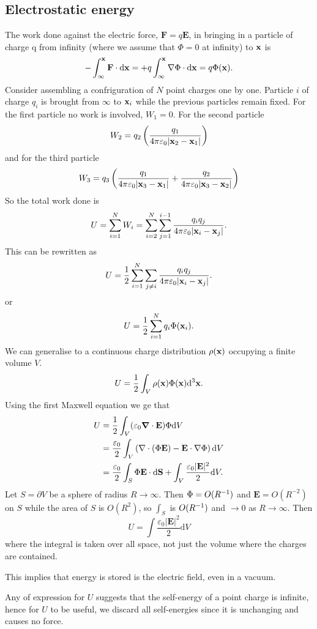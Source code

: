 \documentclass{article}
\begin{document}
\subsection{Electrostatic energy}
The work done against the electric force, $ \mathbf F = q\mathbf E $, in bringing in a particle of charge q from infinity (where we assume that $ \Phi=0 $ at infinity) to $ \mathbf{x} $ is 
\[
	-\int_{\infty}^{\mathbf{x}} \mathbf F \cdot\mathrm d\mathbf{x} = +q\int_\infty^{\mathbf{x}} \nabla\Phi\cdot\mathrm d\mathbf{x} = q\Phi(\mathbf{x}).
\]
Consider assembling a confriguration of $ N $ point charges one by one. Particle $ i $ of charge $ q_i $ is brought from $ \infty $ to $ \mathbf{x}_i $ while the previous particles remain fixed. For the first particle no work is involved, $ W_1 = 0 $. For the second particle
\[
	W_2 = q_2\left(\frac{q_1}{4\pi\varepsilon_0 |\mathbf{x}_2-\mathbf{x}_1|}\right)
\]
and for the third particle
\[
	W_3 = q_3\left(\frac{q_1}{4\pi\varepsilon_0 |\mathbf{x}_3-\mathbf{x}_1|} + \frac{q_2}{4\pi\varepsilon_0 |\mathbf{x}_3-\mathbf{x}_2|}\right)
\]
So the total work done is
\[
	U= \sum_{i=1}^N W_i = \sum_{i=2}^N\sum_{j=1}^{i-1} \frac{q_i q_j}{4\pi\varepsilon_0 |\mathbf{x}_i-\mathbf{x}_j|}.
\]
This can be rewritten as
\[
U=	\frac 12 \sum_{i=1}^N\sum_{j\ne i} \frac{q_iq_j}{4\pi \varepsilon_0|\mathbf{x}_i-\mathbf{x}_j|}.
\]
or
\[
	U = \frac 12 \sum_{i=1}^N q_i\Phi(\mathbf{x}_i).
\]
We can generalise to a continuous charge distribution $ \rho(\mathbf{x}) $ occupying a finite volume $ V $.
\[
  U= \frac 12 \int_V\rho(\mathbf{x})\Phi(\mathbf{x})\mathrm d^3 \mathbf{x}.
\]
Using the first Maxwell equation we ge that
\begin{align*}
	U &= \frac 12 \int_V(\varepsilon_0 \grad\cdot \mathbf E)\Phi\mathrm dV \\
	  &= \frac{\varepsilon_0}2 \int_V\left(\nabla\cdot(\Phi\mathbf E) - \mathbf E \cdot \nabla \Phi\right)\mathrm dV\\
	  &= \frac{\varepsilon_0}2 \int_S \Phi \mathbf E \cdot\mathrm d\mathbf S + \int_V \frac{\varepsilon_0 |\mathbf E|^2}2 \mathrm dV.
\end{align*}
Let $ S=\partial V $ be a sphere of radius $ R\to\infty $. Then $ \Phi= O({R}^{-1}) $ and $ \mathbf E = O(R^{-2}) $ on $ S $ while the area of $ S $ is $ O(R^2) $, so $ \int_S $ is $ O({R}^{-1}) $ and $ \to 0 $ as $ R\to\infty $. Then
\[
	U = \int\frac{\varepsilon_0 |\mathbf E|^2}2 \mathrm dV
\]
where the integral is taken over all space, not just the volume where the charges are contained.
\begin{remark}
  This implies that energy is stored is the electric field, even in a vacuum.
\end{remark}
Any of expression for $ U $ suggests that the self-energy of a point charge is infinite, hence for $ U $ to be useful, we discard all self-energies since it is unchanging and causes no force.
\end{document}
